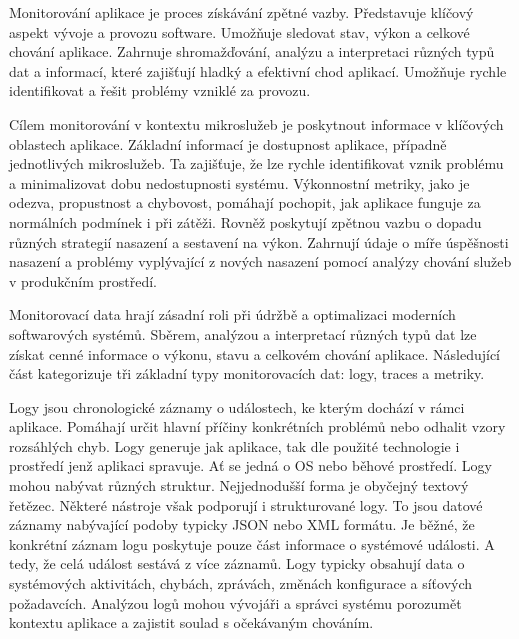 


Monitorování aplikace je proces získávání zpětné vazby. Představuje klíčový aspekt vývoje a provozu software. \cite{Riedesel2021} Umožňuje sledovat stav, výkon a celkové chování aplikace. Zahrnuje shromažďování, analýzu a interpretaci různých typů dat a informací, které zajišťují hladký a efektivní chod aplikací. Umožňuje rychle identifikovat a řešit problémy vzniklé za provozu. 


Cílem monitorování v kontextu mikroslužeb je poskytnout informace v klíčových oblastech aplikace. Základní informací je dostupnost aplikace, případně jednotlivých mikroslužeb. Ta zajišťuje, že lze rychle identifikovat vznik problému a minimalizovat dobu nedostupnosti systému. Výkonnostní metriky, jako je odezva, propustnost a chybovost, pomáhají pochopit, jak aplikace funguje za normálních podmínek i při zátěži. \cite{Riedesel2021} Rovněž poskytují zpětnou vazbu o dopadu různých strategií nasazení a sestavení na výkon. Zahrnují údaje o míře úspěšnosti nasazení a problémy vyplývající z nových nasazení pomocí analýzy chování služeb v produkčním prostředí.


Monitorovací data hrají zásadní roli při údržbě a optimalizaci moderních softwarových systémů. Sběrem, analýzou a interpretací různých typů dat lze získat cenné informace o výkonu, stavu a celkovém chování aplikace. Následující část kategorizuje tři základní typy monitorovacích dat: logy, traces a metriky. \cite{Majors2022}


Logy jsou chronologické záznamy o událostech, ke kterým dochází v rámci aplikace. Pomáhají určit hlavní příčiny konkrétních problémů nebo odhalit vzory rozsáhlých chyb. Logy generuje jak aplikace, tak dle použité technologie i prostředí jenž aplikaci spravuje. Ať se jedná o OS nebo běhové prostředí. Logy mohou nabývat různých struktur. Nejjednodušší forma je obyčejný textový řetězec. Některé nástroje však podporují i strukturované logy. To jsou datové záznamy nabývající podoby typicky JSON nebo XML formátu. Je běžné, že konkrétní záznam logu poskytuje pouze část informace o systémové události. A tedy, že celá událost sestává z více záznamů. \cite{Majors2022} Logy typicky obsahují data o systémových aktivitách, chybách, zprávách, změnách konfigurace a síťových požadavcích. Analýzou logů mohou vývojáři a správci systému porozumět kontextu aplikace a zajistit soulad s očekávaným chováním. \cite{Majors2022}

